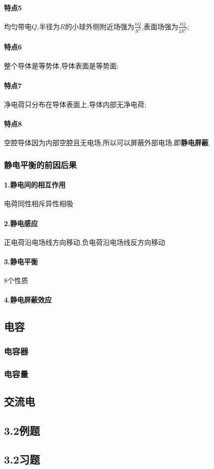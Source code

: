 \paragraph{特点5}\qquad 均匀带电$Q$,半径为$R$的小球外侧附近场强为$\frac{kQ}{R^2}$,表面场强为$\frac{kQ}{2R^2}$;
\paragraph{特点6}\qquad 整个导体是等势体,导体表面是等势面;
\paragraph{特点7}\qquad 净电荷只分布在导体表面上,导体内部无净电荷;
\paragraph{特点8}\qquad 空腔导体因为内部空腔且无电场,所以可以屏蔽外部电场,即\textbf{静电屏蔽}.
\subsubsection{静电平衡的前因后果}
\paragraph{1.静电间的相互作用}\qquad 电荷同性相斥异性相吸 
\paragraph{2.静电感应}\qquad 正电荷沿电场线方向移动,负电荷沿电场线反方向移动 
\paragraph{3.静电平衡}\qquad 8个性质 
\paragraph{4.静电屏蔽效应}\qquad
\subsection{电容}
\subsubsection{电容器}
\subsubsection{电容量}
\subsection{交流电}
\subsection{3.2例题}
\subsection{3.2习题}